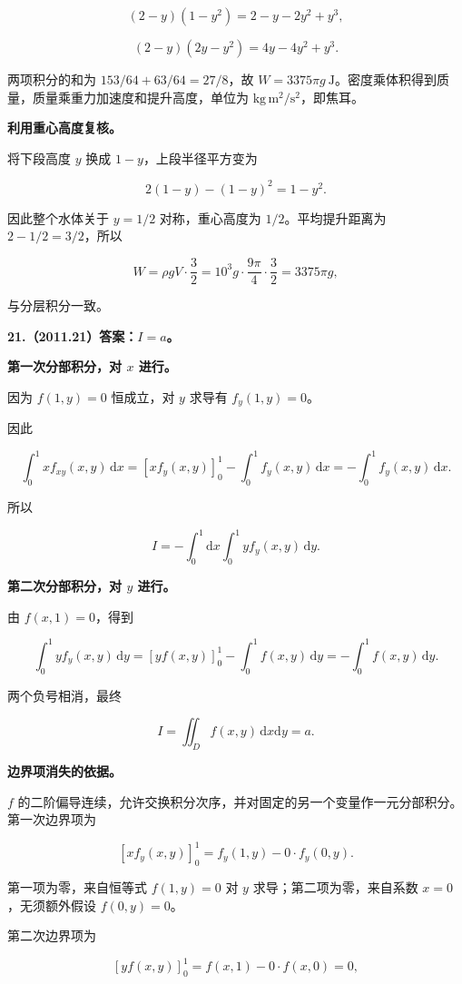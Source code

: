 \documentclass[UTF8,11pt,fontset=windows]{ctexart}
\begin{document}
$$
(2-y)(1-y^2)=2-y-2y^2+y^3,
$$

$$
(2-y)(2y-y^2)=4y-4y^2+y^3.
$$

两项积分的和为 $153/64+63/64=27/8$，故 $W=3375\pi g\ \mathrm J$。密度乘体积得到质量，质量乘重力加速度和提升高度，单位为 $\mathrm{kg\,m^2/s^2}$，即焦耳。

\textbf{利用重心高度复核。}

将下段高度 $y$ 换成 $1-y$，上段半径平方变为

$$
2(1-y)-(1-y)^2=1-y^2.
$$

因此整个水体关于 $y=1/2$ 对称，重心高度为 $1/2$。平均提升距离为 $2-1/2=3/2$，所以

$$
W=\rho gV\cdot\frac32
=10^3g\cdot\frac{9\pi}{4}\cdot\frac32=3375\pi g,
$$

与分层积分一致。

\clearpage

\textbf{21.（2011.21）答案：$I=a$。}

\textbf{第一次分部积分，对 $x$ 进行。}

因为 $f(1,y)=0$ 恒成立，对 $y$ 求导有 $f_y(1,y)=0$。

因此

$$
\int_0^1 x f_{xy}(x,y)\,\mathrm dx
=[x f_y(x,y)]_0^1-\int_0^1f_y(x,y)\,\mathrm dx
=-\int_0^1f_y(x,y)\,\mathrm dx.
$$

所以

$$
I=-\int_0^1\mathrm dx\int_0^1 y f_y(x,y)\,\mathrm dy.
$$

\textbf{第二次分部积分，对 $y$ 进行。}

由 $f(x,1)=0$，得到

$$
\int_0^1 y f_y(x,y)\,\mathrm dy
=[y f(x,y)]_0^1-\int_0^1f(x,y)\,\mathrm dy
=-\int_0^1f(x,y)\,\mathrm dy.
$$

两个负号相消，最终

$$
I=\iint_D f(x,y)\,\mathrm dx\mathrm dy=a.
$$

\textbf{边界项消失的依据。}

$f$ 的二阶偏导连续，允许交换积分次序，并对固定的另一个变量作一元分部积分。第一次边界项为

$$
[x f_y(x,y)]_0^1=f_y(1,y)-0\cdot f_y(0,y).
$$

第一项为零，来自恒等式 $f(1,y)=0$ 对 $y$ 求导；第二项为零，来自系数 $x=0$，无须额外假设 $f(0,y)=0$。

第二次边界项为

$$
[y f(x,y)]_0^1=f(x,1)-0\cdot f(x,0)=0,
$$
\end{document}
